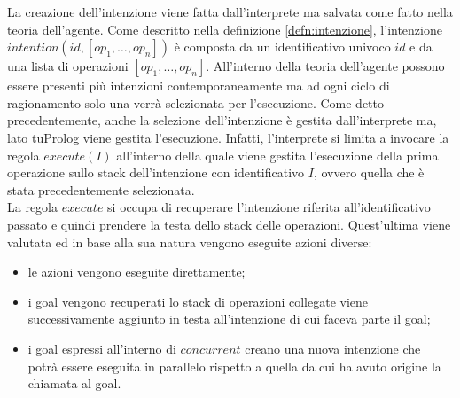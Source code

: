 La creazione dell'intenzione viene fatta dall'interprete ma salvata come fatto nella teoria dell'agente. Come descritto nella definizione \ref{defn:intenzione}, l'intenzione $intention(id,[op_1, \ldots, op_n])$ è composta da un identificativo univoco $id$ e da una lista di operazioni $[op_1, \ldots, op_n]$. All'interno della teoria dell'agente possono essere presenti più intenzioni contemporaneamente ma ad ogni ciclo di ragionamento solo una verrà selezionata per l'esecuzione. Come detto precedentemente, anche la selezione dell'intenzione è gestita dall'interprete ma, lato tuProlog viene gestita l'esecuzione. Infatti, l'interprete si limita a invocare la regola $execute(I)$ all'interno della quale viene gestita l'esecuzione della prima operazione sullo stack dell'intenzione con identificativo $I$, ovvero quella che è stata precedentemente selezionata.
\\
La regola $execute$ si occupa di recuperare l'intenzione riferita all'identificativo passato e quindi prendere la testa dello stack delle operazioni. Quest'ultima viene valutata ed in base alla sua natura vengono eseguite azioni diverse:
\begin{itemize}
\item le azioni vengono eseguite direttamente;
\item i goal vengono recuperati lo stack di operazioni collegate viene successivamente aggiunto in testa all'intenzione di cui faceva parte il goal;
\item i goal espressi all'interno di $concurrent$ creano una nuova intenzione che potrà essere eseguita in parallelo rispetto a quella da cui ha avuto origine la chiamata al goal.
\end{itemize}


